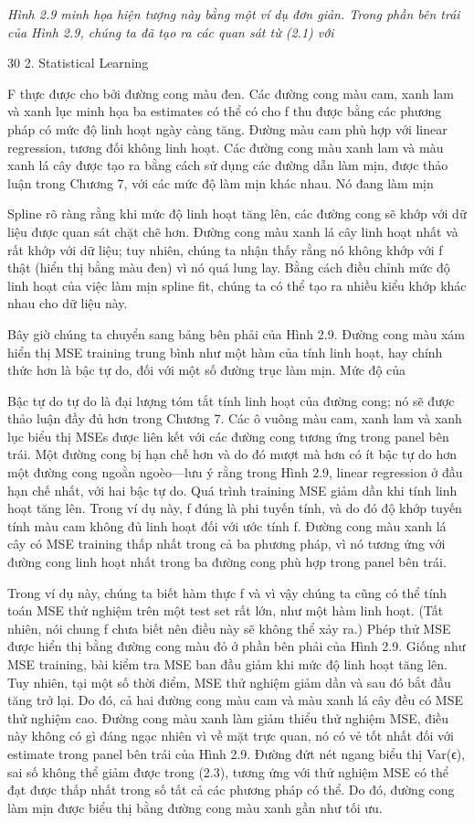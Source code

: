\noindent\textit{Hình 2.9 minh họa hiện tượng này bằng một ví dụ đơn giản. Trong phần bên trái của Hình 2.9, chúng ta đã tạo ra các quan sát từ (2.1) với}

30 2. Statistical Learning

F thực được cho bởi đường cong màu đen. Các đường cong màu cam, xanh lam và xanh lục minh họa ba estimates có thể có cho f thu được bằng các phương pháp có mức độ linh hoạt ngày càng tăng. Đường màu cam phù hợp với linear regression, tương đối không linh hoạt. Các đường cong màu xanh lam và màu xanh lá cây được tạo ra bằng cách sử dụng các đường dẫn làm mịn, được thảo luận trong Chương 7, với các mức độ làm mịn khác nhau. Nó đang làm mịn

Spline rõ ràng rằng khi mức độ linh hoạt tăng lên, các đường cong sẽ khớp với dữ liệu được quan sát chặt chẽ hơn. Đường cong màu xanh lá cây linh hoạt nhất và rất khớp với dữ liệu; tuy nhiên, chúng ta nhận thấy rằng nó không khớp với f thật (hiển thị bằng màu đen) vì nó quá lung lay. Bằng cách điều chỉnh mức độ linh hoạt của việc làm mịn spline fit, chúng ta có thể tạo ra nhiều kiểu khớp khác nhau cho dữ liệu này.

Bây giờ chúng ta chuyển sang bảng bên phải của Hình 2.9. Đường cong màu xám hiển thị MSE training trung bình như một hàm của tính linh hoạt, hay chính thức hơn là bậc tự do, đối với một số đường trục làm mịn. Mức độ của

Bậc tự do tự do là đại lượng tóm tắt tính linh hoạt của đường cong; nó sẽ được thảo luận đầy đủ hơn trong Chương 7. Các ô vuông màu cam, xanh lam và xanh lục biểu thị MSEs được liên kết với các đường cong tương ứng trong panel bên trái. Một đường cong bị hạn chế hơn và do đó mượt mà hơn có ít bậc tự do hơn một đường cong ngoằn ngoèo—lưu ý rằng trong Hình 2.9, linear regression ở đầu hạn chế nhất, với hai bậc tự do. Quá trình training MSE giảm dần khi tính linh hoạt tăng lên. Trong ví dụ này, f đúng là phi tuyến tính, và do đó độ khớp tuyến tính màu cam không đủ linh hoạt đối với ước tính f. Đường cong màu xanh lá cây có MSE training thấp nhất trong cả ba phương pháp, vì nó tương ứng với đường cong linh hoạt nhất trong ba đường cong phù hợp trong panel bên trái.

Trong ví dụ này, chúng ta biết hàm thực f và vì vậy chúng ta cũng có thể tính toán MSE thử nghiệm trên một test set rất lớn, như một hàm linh hoạt. (Tất nhiên, nói chung f chưa biết nên điều này sẽ không thể xảy ra.) Phép thử MSE được hiển thị bằng đường cong màu đỏ ở phần bên phải của Hình 2.9. Giống như MSE training, bài kiểm tra MSE ban đầu giảm khi mức độ linh hoạt tăng lên. Tuy nhiên, tại một số thời điểm, MSE thử nghiệm giảm dần và sau đó bắt đầu tăng trở lại. Do đó, cả hai đường cong màu cam và màu xanh lá cây đều có MSE thử nghiệm cao. Đường cong màu xanh làm giảm thiểu thử nghiệm MSE, điều này không có gì đáng ngạc nhiên vì về mặt trực quan, nó có vẻ tốt nhất đối với estimate trong panel bên trái của Hình 2.9. Đường đứt nét ngang biểu thị Var(ϵ), sai số không thể giảm được trong (2.3), tương ứng với thử nghiệm MSE có thể đạt được thấp nhất trong số tất cả các phương pháp có thể. Do đó, đường cong làm mịn được biểu thị bằng đường cong màu xanh gần như tối ưu.

